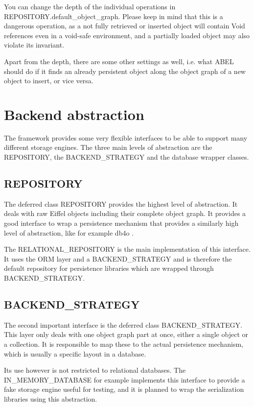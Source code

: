 You can change the depth of the individual operations in REPOSITORY.default\_object\_graph. 
Please keep in mind that this is a dangerous operation, as a not fully retrieved or inserted object will contain Void references even in a void-safe environment, and a partially loaded object may also violate its invariant.

Apart from the depth, there are some other settings as well, i.e. what ABEL should do if it finds an already persistent object along the object graph of a new object to insert, or vice versa.

\section{Backend abstraction}

The framework provides some very flexible interfaces to be able to support many different storage engines. 
The three main levels of abstraction are the REPOSITORY, the BACKEND\_STRATEGY and the database wrapper classes.

\subsection{REPOSITORY}

The deferred class REPOSITORY provides the highest level of abstraction.
It deals with raw Eiffel objects including their complete object graph.
It provides a good interface to wrap a persistence mechanism that provides a similarly high level of abstraction, like for example db4o .

The RELATIONAL\_REPOSITORY is the main implementation of this interface.
It uses the ORM layer and a BACKEND\_STRATEGY and is therefore the default repository for persistence libraries which are wrapped through BACKEND\_STRATEGY.

\subsection{BACKEND\_STRATEGY}

The second important interface is the deferred class BACKEND\_STRATEGY.
This layer only deals with one object graph part at once, either a single object or a collection.
It is responsible to map these to the actual persistence mechanism, which is usually a specific layout in a database.

Its use however is not restricted to relational databases.
The IN\_MEMORY\_DATABASE for example implements this interface to provide a fake storage engine useful for testing, and it is planned to wrap the serialization libraries using this abstraction.

